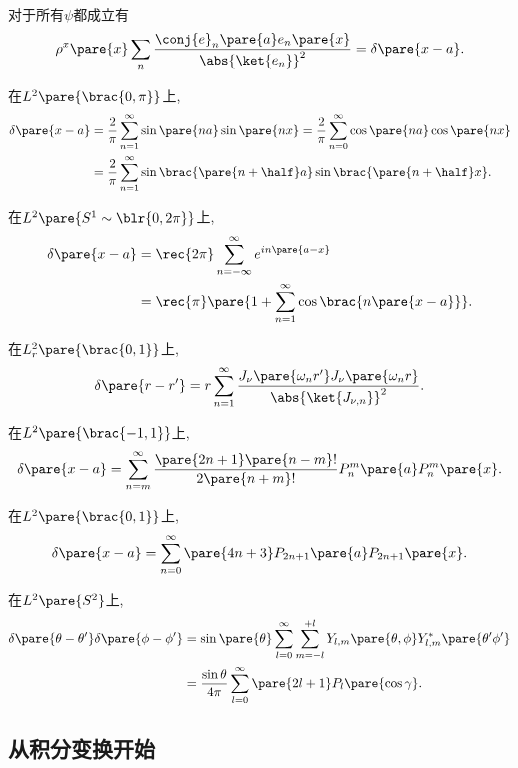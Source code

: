 \documentclass[hidelinks]{ctexart}
\begin{document}
\newpoint{}对于所有$\psi$都成立有
\[ \rho^x\pare{x} \sum_n \frac{\conj{e}_n\pare{a}e_n\pare{x}}{\abs{\ket{e_n}}^2} = \delta\pare{x-a}. \]
\begin{ex}
    在$L^2\pare{\brac{0,\pi}}$上,
    \begin{align*}
        \delta\pare{x-a} &= \frac{2}{\pi}\sum_{n=1}^\infty \sin \pare{na}\sin \pare{nx} = \frac{2}{\pi} \sum_{n=0}^\infty\cos\pare{na}\cos\pare{nx} \\
        &= \frac{2}{\pi}\sum_{n=1}^\infty\sin\brac{\pare{n+\half} a}\sin\brac{\pare{n+\half}x}.
    \end{align*}
\end{ex}
\begin{ex}
    在$L^2\pare{S^1\sim \blr{0,2\pi}}$上,
    \begin{align*}
        \delta\pare{x-a} &= \rec{2\pi}\sum_{n=-\infty}^\infty e^{in\pare{a-x}} \\
        &= \rec{\pi}\pare{1+\sum_{n=1}^\infty \cos\brac{n\pare{x-a}}}.
    \end{align*}
\end{ex}
\begin{ex}
    在$L_r^2\pare{\brac{0,1}}$上,
    \[ \delta\pare{r-r'} = r\sum_{n=1}^\infty \frac{J_\nu\pare{\omega_n r'}J_\nu\pare{\omega_n r}}{\abs{\ket{J_{\nu,n}}}^2}. \]
\end{ex}
\begin{ex}
    在$L^2\pare{\brac{-1,1}}$上,
    \[ \delta\pare{x-a} = \sum_{n=m}^\infty \frac{\pare{2n+1}\pare{n-m}!}{2\pare{n+m}!}P_n^m\pare{a}P_n^m\pare{x}. \]
\end{ex}
\begin{ex}
    在$L^2\pare{\brac{0,1}}$上,
    \[ \delta\pare{x-a} = \sum_{n=0}^\infty \pare{4n+3} P_{2n+1}\pare{a}P_{2n+1}\pare{x}. \]
\end{ex}
\begin{ex}
    在$L^2\pare{S^2}$上,
    \begin{align*}
        \delta\pare{\theta-\theta'}\delta\pare{\phi-\phi'} &= \sin\pare{\theta}\sum_{l=0}^\infty \sum_{m=-l}^{+l}Y_{l,m}\pare{\theta,\phi}Y_{l,m}^* \pare{\theta'\phi'} \\
        &= \frac{\sin \theta}{4\pi} \sum_{l=0}^\infty \pare{2l+1}P_l\pare{\cos\gamma}.
    \end{align*}
\end{ex}


\subsection{从积分变换开始} %
\label{sub:从积分变换开始}
\end{document}
